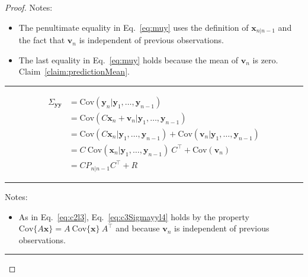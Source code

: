 \documentclass[12pt]{article}
\begin{document}
\begin{proof}
    Notes:

    \begin{itemize}
        \item The penultimate equality in Eq.~\ref{eq:muy} uses the definition
            of $\mathbf{x}_{n|n-1}$ and the fact that $\mathbf{v}_n$ is
            independent of previous observations.

        \item The last equality in Eq.~\ref{eq:muy} holds because the mean of
            $\mathbf{v}_n$ is zero.
            Claim~\ref{claim:predictionMean}.
    \end{itemize}

    \rule{2in}{0.4pt}

    \begin{align}
        \Sigma_{\mathbf{y}\mathbf{y}}&=\text{Cov}(\mathbf{y}_n|\mathbf{y}_1,\ldots,\mathbf{y}_{n-1})\nonumber\\
                                     &=\text{Cov}(C\mathbf{x}_n+\mathbf{v}_n|\mathbf{y}_1,\ldots,\mathbf{y}_{n-1})\nonumber\\
                                     &=\text{Cov}(C\mathbf{x}_n|\mathbf{y}_1,\ldots,\mathbf{y}_{n-1})+\text{Cov}(\mathbf{v}_n|\mathbf{y}_1,\ldots,\mathbf{y}_{n-1})\nonumber\\
                                     &=C\ \text{Cov}(\mathbf{x}_n|\mathbf{y}_1,\ldots,\mathbf{y}_{n-1})\ C^\intercal+\text{Cov}(\mathbf{v}_n)\label{eq:c3Sigmayyl4}\\
                                     &=CP_{n|n-1}C^\intercal+R\label{eq:sigmayy}
    \end{align}

    \rule{2in}{0.4pt}

Notes:

\begin{itemize}

    \item As in Eq.~\ref{eq:c2l3}, Eq.~\ref{eq:c3Sigmayyl4} holds by the
        property
        $\text{Cov}\{A\mathbf{x}\}=A\ \text{Cov}\{\mathbf{x}\}\ A^\intercal$ and
        because $\mathbf{v}_n$ is independent of previous observations.

\end{itemize}

    \rule{2in}{0.4pt}


\end{proof}
\end{document}
